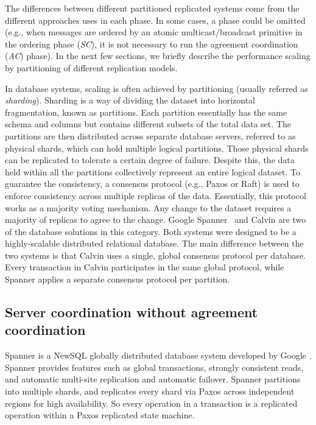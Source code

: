The differences between different partitioned replicated systems come from the
different approaches uses in each phase. In some cases, a phase could be omitted
(e.g., when messages are ordered by an atomic multicast/broadcast primitive in
the ordering phase (\emph{SC}), it is not necessary to run the agreement
coordination (\emph{AC}) phase). In the next few sections, we briefly describe the
performance scaling by partitioning of different replication models.


In database systems, scaling is often achieved by partitioning (usually referred
as \emph{sharding}). Sharding is a way of dividing the dataset into horizontal
fragmentation, known as partitions. Each partition essentially has the same
schema and columns but contains different subsets of the total data set. The
partitions are then distributed across separate database servers, referred to as
physical shards, which can hold multiple logical partitions. Those physical
shards can be replicated to tolerate a certain degree of failure. Despite
this, the data held within all the partitions collectively represent an entire
logical dataset. To guarantee the consistency, a consensus protocol (e.g., Paxos
or Raft) is used to enforce consistency across multiple replicas of the data.
Essentially, this protocol works as a majority voting mechanism. Any change to
the dataset requires a majority of replicas to agree to the change. Google
Spanner~\cite{corbett2013spanner} and Calvin \cite{calvin} are two of the
database solutions in this category. Both systems were designed to be a
highly-scalable distributed relational database. The main difference between the
two systems is that Calvin uses a single, global consensus protocol per
database. Every transaction in Calvin participates in the same global protocol,
while Spanner applies a separate consensus protocol per partition.



\subsection{Server coordination without agreement coordination}


Spanner is a NewSQL \cite{Grolinger:2013tp} globally distributed database system
developed by Google \cite{corbett2013spanner}. Spanner provides features such as
global transactions, strongly consistent reads, and automatic multi-site
replication and automatic failover. Spanner partitions into multiple shards, and
replicates every shard via Paxos across independent regions for high
availability. So every operation in a transaction is a replicated operation
within a Paxos replicated state machine.

